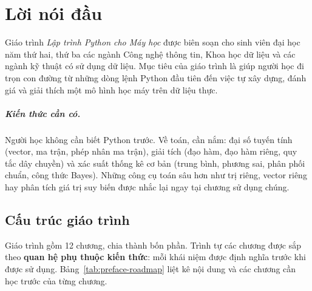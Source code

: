 
\chapter*{Lời nói đầu}

Giáo trình \textit{Lập trình Python cho Máy học} được biên soạn cho sinh viên đại học năm thứ hai, thứ ba các ngành Công nghệ thông tin, Khoa học dữ liệu và các ngành kỹ thuật có sử dụng dữ liệu. Mục tiêu của giáo trình là giúp người học đi trọn con đường từ những dòng lệnh Python đầu tiên đến việc tự xây dựng, đánh giá và giải thích một mô hình học máy trên dữ liệu thực.

\paragraph{Kiến thức cần có.} Người học không cần biết Python trước. Về toán, cần nắm: đại số tuyến tính (vector, ma trận, phép nhân ma trận), giải tích (đạo hàm, đạo hàm riêng, quy tắc dây chuyền) và xác suất thống kê cơ bản (trung bình, phương sai, phân phối chuẩn, công thức Bayes). Những công cụ toán sâu hơn như trị riêng, vector riêng hay phân tích giá trị suy biến được nhắc lại ngay tại chương sử dụng chúng.

\section*{Cấu trúc giáo trình}

Giáo trình gồm 12 chương, chia thành bốn phần. Trình tự các chương được sắp theo \textbf{quan hệ phụ thuộc kiến thức}: mỗi khái niệm được định nghĩa trước khi được sử dụng. Bảng~\ref{tab:preface-roadmap} liệt kê nội dung và các chương cần học trước của từng chương.

